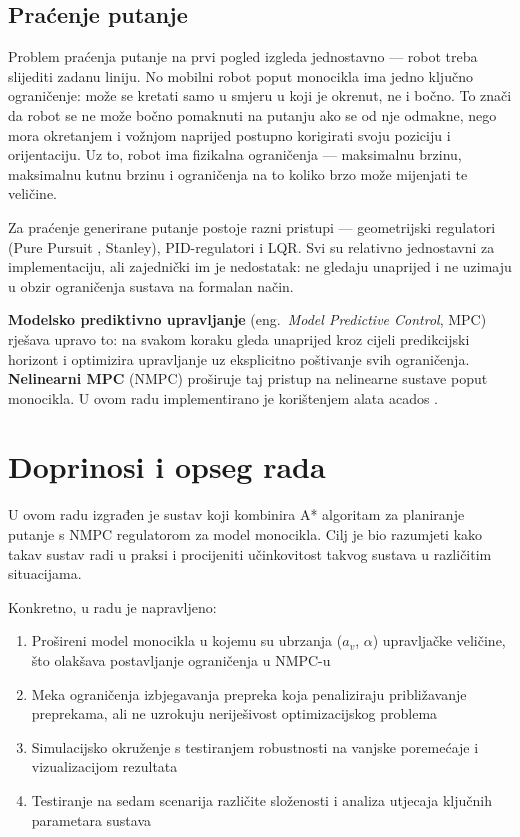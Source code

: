 \subsection{Praćenje putanje}

Problem praćenja putanje na prvi pogled izgleda jednostavno --- robot treba slijediti zadanu liniju. No mobilni robot poput monocikla ima jedno ključno ograničenje: može se kretati samo u smjeru u koji je okrenut, ne i bočno. To znači da robot se ne može bočno pomaknuti na putanju ako se od nje odmakne, nego mora okretanjem i vožnjom naprijed postupno korigirati svoju poziciju i orijentaciju. Uz to, robot ima fizikalna ograničenja --- maksimalnu brzinu, maksimalnu kutnu brzinu i ograničenja na to koliko brzo može mijenjati te veličine.

Za praćenje generirane putanje postoje razni pristupi --- geometrijski regulatori (Pure Pursuit \cite{coulter1992purepursuit}, Stanley), PID-regulatori i LQR. Svi su relativno jednostavni za implementaciju, ali zajednički im je nedostatak: ne gledaju unaprijed i ne uzimaju u obzir ograničenja sustava na formalan način.

\textbf{Modelsko prediktivno upravljanje} (eng.\ \textit{Model Predictive Control}, MPC) \cite{rawlings2017mpc, borrelli2017predictive} rješava upravo to: na svakom koraku gleda unaprijed kroz cijeli predikcijski horizont i optimizira upravljanje uz eksplicitno poštivanje svih ograničenja. \textbf{Nelinearni MPC} (NMPC) proširuje taj pristup na nelinearne sustave poput monocikla. U ovom radu implementirano je korištenjem alata acados \cite{verschueren2022acados, acados_docs}.

\section{Doprinosi i opseg rada}

U ovom radu izgrađen je sustav koji kombinira A* algoritam za planiranje putanje s NMPC regulatorom za model monocikla. Cilj je bio razumjeti kako takav sustav radi u praksi i procijeniti učinkovitost takvog sustava u različitim situacijama.

Konkretno, u radu je napravljeno:

\begin{enumerate}
  \item Prošireni model monocikla u kojemu su ubrzanja ($a_v$, $\alpha$) upravljačke veličine, što olakšava postavljanje ograničenja u NMPC-u
  \item Meka ograničenja izbjegavanja prepreka koja penaliziraju približavanje preprekama, ali ne uzrokuju neriješivost optimizacijskog problema
  \item Simulacijsko okruženje s testiranjem robustnosti na vanjske poremećaje i vizualizacijom rezultata
  \item Testiranje na sedam scenarija različite složenosti i analiza utjecaja ključnih parametara sustava
\end{enumerate}
